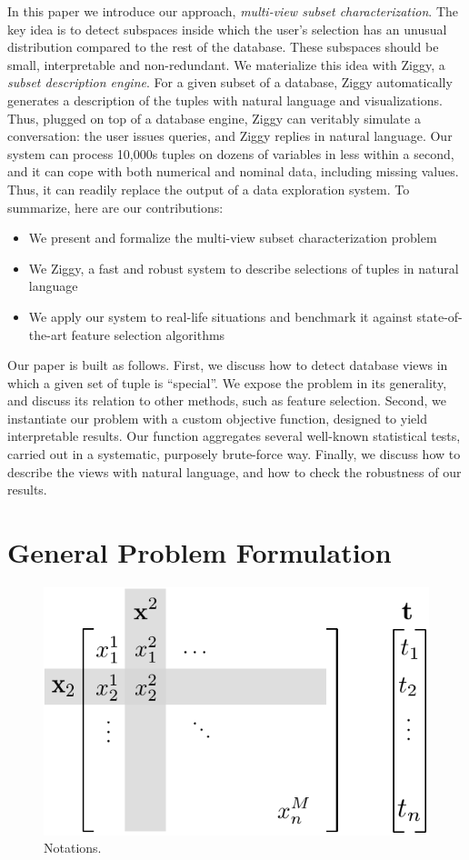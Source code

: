 In this paper we introduce our approach, \emph{multi-view subset
characterization}. The key idea is to detect subspaces inside which the user's
selection has an unusual distribution compared to the rest of the database.
These subspaces should be small, interpretable and non-redundant.  We
materialize this idea with Ziggy, a \emph{subset description engine}. For a
given subset of a database, Ziggy automatically generates a description of the
tuples with natural language and visualizations.  Thus, plugged on top of a
database engine, Ziggy can veritably simulate a conversation: the
user issues queries, and Ziggy replies in natural language. Our system can
process 10,000s tuples on dozens of variables in less within a second, and it can cope with
both numerical and nominal data, including missing values.  Thus, it can
readily replace the output of a data exploration system. To summarize, here are
our contributions:
\begin{itemize}
    \item We present and formalize the multi-view subset characterization problem
    \item We Ziggy, a fast and robust system to describe selections of tuples
        in natural language
    \item We apply our system to real-life situations and benchmark it against
        state-of-the-art feature selection algorithms
\end{itemize}

Our paper is built as follows. First, we discuss how to detect database views
in which a given set of tuple is ``special''. We expose the problem in its
generality, and discuss its relation to other methods, such as feature
selection. Second, we instantiate our problem with a custom objective function,
designed to yield interpretable results. Our function aggregates several
well-known statistical tests, carried out in a systematic, purposely
brute-force way.  Finally, we discuss how to describe the views with natural
language, and how to check the robustness of our results.

\section{General Problem Formulation}
\label{sec:problem}
\begin{figure}
  \centering
  \includegraphics[width=0.5\columnwidth]{Figures/Notations}
  \caption{Notations.}
  \label{pic:notations}
\end{figure}

